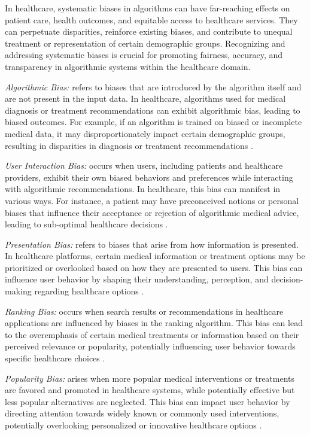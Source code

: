 \documentclass{article}
\begin{document}
In healthcare, systematic biases in algorithms can have far-reaching effects on patient care, health outcomes, and equitable access to healthcare services. They can perpetuate disparities, reinforce existing biases, and contribute to unequal treatment or representation of certain demographic groups. Recognizing and addressing systematic biases is crucial for promoting fairness, accuracy, and transparency in algorithmic systems within the healthcare domain.

\emph{Algorithmic Bias:} refers to biases that are introduced by the algorithm itself and are not present in the input data. In healthcare, algorithms used for medical diagnosis or treatment recommendations can exhibit algorithmic bias, leading to biased outcomes. For example, if an algorithm is trained on biased or incomplete medical data, it may disproportionately impact certain demographic groups, resulting in disparities in diagnosis or treatment recommendations \cite{panch2019artificial}.

\emph{User Interaction Bias:} occurs when users, including patients and healthcare providers, exhibit their own biased behaviors and preferences while interacting with algorithmic recommendations. In healthcare, this bias can manifest in various ways. For instance, a patient may have preconceived notions or personal biases that influence their acceptance or rejection of algorithmic medical advice, leading to sub-optimal healthcare decisions \cite{baeza2018bias}.

\emph{Presentation Bias:} refers to biases that arise from how information is presented. In healthcare platforms, certain medical information or treatment options may be prioritized or overlooked based on how they are presented to users. This bias can influence user behavior by shaping their understanding, perception, and decision-making regarding healthcare options \cite{baeza2018bias}.

\emph{Ranking Bias: } occurs when search results or recommendations in healthcare applications are influenced by biases in the ranking algorithm. This bias can lead to the overemphasis of certain medical treatments or information based on their perceived relevance or popularity, potentially influencing user behavior towards specific healthcare choices \cite{baeza2018bias}.

\emph{Popularity Bias:} arises when more popular medical interventions or treatments are favored and promoted in healthcare systems, while potentially effective but less popular alternatives are neglected. This bias can impact user behavior by directing attention towards widely known or commonly used interventions, potentially overlooking personalized or innovative healthcare options \cite{ciampaglia2018algorithmic}.
\end{document}

